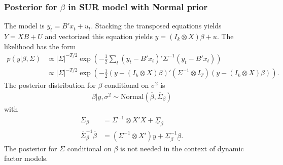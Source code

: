 \documentclass[12pt,a4paper]{scrartcl}
\begin{document}
\subsubsection*{Posterior for $\beta$ in SUR model with Normal prior}

The model is $y_t = B' x_t + u_t$. Stacking the transposed equations yields $Y = XB + U$ and vectorized this equation yields $y = (I_k \otimes X) \beta + u$. The likelihood has the form
\begin{align}
p(y|\beta, \Sigma) 
&\propto |\Sigma|^{-T/2} \exp\left(-\frac{1}{2} \sum_t (y_t - B' x_t)'\Sigma^{-1}(y_t - B'x_t)\right)\\
&\propto |\Sigma|^{-T/2} \exp\left(-\frac{1}{2}(y-(I_k\otimes X)\beta)'(\Sigma^{-1}\otimes I_T)(y-(I_k\otimes X)\beta)\right).
\end{align}
The posterior distribution for $\beta$ conditional on $\sigma^2$ is
\begin{align}
\beta|y, \sigma^2 \sim \mathrm{Normal}(\overline{\beta}, \overline{\Sigma}_\beta)
\end{align}
with
\begin{align}
\overline{\Sigma}_\beta &= \Sigma^{-1} \otimes X'X + \underline{\Sigma}_\beta \\
\overline{\Sigma}_\beta^{-1}\overline{\beta} &= (\Sigma^{-1} \otimes X')y + \underline{\Sigma}_\beta^{-1} \underline{\beta}.
\end{align}
The posterior for $\Sigma$ conditional on $\beta$ is not needed in the context of dynamic factor models.



\end{document}
